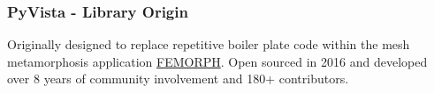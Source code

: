 \documentclass[t]{beamer}
\begin{document}
\begin{frame}
    \frametitle{PyVista - Library Origin}
    Originally designed to replace repetitive boiler plate code within the mesh metamorphosis application \href{https://www.femorph.com/}{FEMORPH}. Open sourced in 2016 and developed over 8 years of community involvement and 180+ contributors.
    \vspace{-5pt}
    \begin{center}
        \setlength{\fboxrule}{0.5pt}
        \setlength{\fboxsep}{0pt}
    \end{center}
\end{frame}

\end{document}

